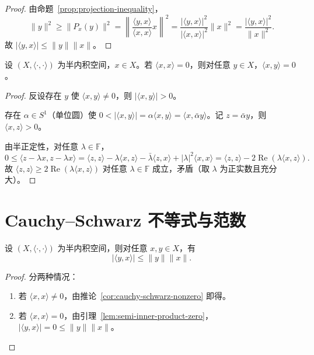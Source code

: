 \documentclass[lang=cn,a4paper,newtx,section]{elegantbook}
\begin{document}
\begin{proof}
  由命题~\ref{prop:projection-inequality}，
  \[
    \|y\|^2\ge\|P_x(y)\|^2=\left\|\frac{\langle y,x\rangle}{\langle x,x\rangle}x\right\|^2=\frac{|\langle y,x\rangle|^2}{|\langle x,x\rangle|^2}\|x\|^2=\frac{|\langle y,x\rangle|^2}{\|x\|^2}.
  \]
  故 $|\langle y,x\rangle|\le\|y\|\|x\|$。
\end{proof}

\begin{lemma}\label{lem:semi-inner-product-zero}
  设 $(X,\langle\cdot,\cdot\rangle)$ 为半内积空间，$x\in X$。若 $\langle x,x\rangle=0$，则对任意 $y\in X$，$\langle x,y\rangle=0$。
\end{lemma}

\begin{proof}
  反设存在 $y$ 使 $\langle x,y\rangle\ne 0$，则 $|\langle x,y\rangle|>0$。

  存在 $\alpha\in S^1$（单位圆）使 $0<|\langle x,y\rangle|=\alpha\langle x,y\rangle=\langle x,\bar{\alpha}y\rangle$。记 $z=\bar{\alpha}y$，则 $\langle x,z\rangle>0$。

  由半正定性，对任意 $\lambda\in\mathbb{F}$，
  \[
    0\le\langle z-\lambda x,z-\lambda x\rangle=\langle z,z\rangle-\lambda\langle x,z\rangle-\bar{\lambda}\langle z,x\rangle+|\lambda|^2\langle x,x\rangle=\langle z,z\rangle-2\operatorname{Re}(\lambda\langle x,z\rangle).
  \]
  故 $\langle z,z\rangle\ge 2\operatorname{Re}(\lambda\langle x,z\rangle)$ 对任意 $\lambda\in\mathbb{F}$ 成立，矛盾（取 $\lambda$ 为正实数且充分大）。
\end{proof}

\section{Cauchy--Schwarz 不等式与范数}

\begin{theorem}\label{thm:cauchy-schwarz}
  设 $(X,\langle\cdot,\cdot\rangle)$ 为半内积空间，则对任意 $x,y\in X$，有
  \[
    |\langle y,x\rangle|\le\|y\|\|x\|.
  \]
\end{theorem}

\begin{proof}
  分两种情况：
  \begin{enumerate}
    \item 若 $\langle x,x\rangle\ne 0$，由推论~\ref{cor:cauchy-schwarz-nonzero} 即得。
    \item 若 $\langle x,x\rangle=0$，由引理~\ref{lem:semi-inner-product-zero}，$|\langle y,x\rangle|=0\le\|y\|\|x\|$。
  \end{enumerate}
\end{proof}
\end{document}
